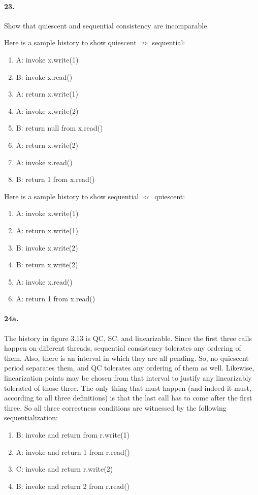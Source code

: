 \documentclass[
]{article}
\begin{document}
\paragraph{23.} Show that quiescent and sequential consistency are incomparable.

Here is a sample history to show quiescent $\not\Rightarrow$ sequential:
\begin{enumerate}
\item A: invoke x.write(1)
\item B: invoke x.read()
\item A: return x.write(1)
\item A: invoke x.write(2)
\item B: return null from x.read()
\item A: return x.write(2)
\item A: invoke x.read()
\item B: return 1 from x.read()
\end{enumerate}

Here is a sample history to show sequential $\not\Leftarrow$ quiescent:
\begin{enumerate}
\item A: invoke x.write(1)
\item A: return x.write(1)
\item B: invoke x.write(2)
\item B: return x.write(2)
\item A: invoke x.read()
\item A: return 1 from x.read()
\end{enumerate}

\paragraph{24a.} The history in figure 3.13 is QC, SC, and linearizable.  Since the first three calls happen on different threads, sequential consistency tolerates any ordering of them.  Also, there is an interval in which they are all pending.  So, no quiescent period separates them, and QC tolerates any ordering of them as well.  Likewise,  linearization points may be chosen from that interval to justify any linearizably tolerated of those three.  The only thing that must happen (and indeed it must, according to all three definitions) is that the last call has to come after the first three.
So all three correctness conditions are witnessed by the following sequentialization:
\begin{enumerate}
\item B: invoke and return from r.write(1)
\item A: invoke and return 1 from r.read()
\item C: invoke and return r.write(2)
\item B: invoke and return 2 from r.read()
\end{enumerate}
\end{document}
